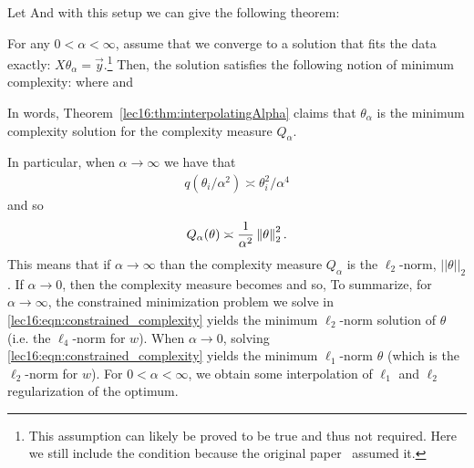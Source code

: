 Let
And with this setup we can give the following theorem:
\begin{theorem}
	 \label{lec16:thm:interpolatingAlpha}
For any $0 < \alpha < \infty$, assume that we  converge to a solution that fits the data exactly: $X \theta_{\alpha} = \vec{y}$.\footnote{This assumption can likely be proved to be true and thus not required. Here we still include the condition because the original paper~\citet{woodworth2020kernel} assumed it.}  Then, the solution satisfies the following notion of minimum complexity:
where
and
\end{theorem}
In words, Theorem~\ref{lec16:thm:interpolatingAlpha} claims that $\theta_\alpha$ is the minimum complexity solution for the complexity measure $Q_\alpha$.

\begin{remark}
In particular, when $\alpha \to \infty$ we have that 
\begin{align}
    q(\theta_i /\alpha^2) \asymp \theta_i^2/\alpha^4
\end{align}
and so 
\begin{align}
    Q_\alpha(\theta) \asymp \frac{1}{\alpha^2} \left\|\theta\right\|_2^2.
\end{align}
This means that if $\alpha \to \infty$ than the complexity measure $Q_\alpha$ is the $\ell_2$-norm, $||\theta||_2$.  If $\alpha \to 0$, then the complexity measure becomes
and so,
To summarize, for $\alpha \to \infty$, the constrained minimization problem we solve in \eqref{lec16:eqn:constrained_complexity} yields the minimum $\ell_2$-norm solution of $\theta$ (i.e. the $\ell_4$-norm for $w$).  When $\alpha \to 0$, solving \eqref{lec16:eqn:constrained_complexity} yields the minimum $\ell_1$-norm $\theta$ (which is the $\ell_2$-norm for $w$).  For $0 < \alpha < \infty$, we obtain some interpolation of $\ell_1$ and $\ell_2$ regularization of the optimum.
\end{remark}

